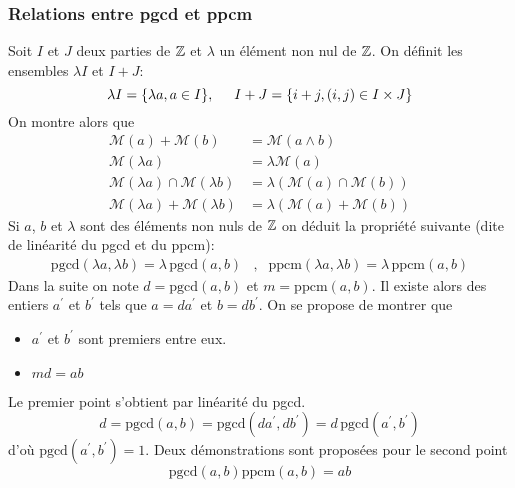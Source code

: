 \begin{propn}
\subsubsection{Relations entre pgcd et ppcm}
Soit $I$ et $J$ deux parties de $\mathbb{Z}$ et $\lambda$ un élément non nul de $\mathbb{Z}$. On définit les ensembles $\lambda I$ et $I+J$:
\begin{displaymath}
  \lambda I = \{\lambda a , a\in I\} ,\hspace{0.5cm} I+J = \left\lbrace i+j, (i,j)\in I\times J\right\rbrace 
\end{displaymath}
On montre alors que 
\begin{align*}
\mathcal{M}(a) + \mathcal{M}(b) &= \mathcal{M}(a\wedge b) \\
 \mathcal M (\lambda a) &= \lambda \mathcal M ( a) \\
\mathcal M (\lambda a)\cap  \mathcal M (\lambda b) &= \lambda \left( \mathcal M ( a) \cap  \mathcal M (b)\right) \\
\mathcal M (\lambda a) + \mathcal M (\lambda b) &= \lambda \left( \mathcal M ( a) +  \mathcal M (b)\right)
\end{align*}
Si $a$, $b$ et $\lambda$ sont des éléments non nuls de $\mathbb{Z}$ on déduit la propriété suivante (dite de linéarité du pgcd et du ppcm):
\begin{align*}
 \text{pgcd}(\lambda a, \lambda b)=\lambda\, \text{pgcd}(a, b) &,& \text{ppcm}(\lambda a, \lambda b)=\lambda\, \text{ppcm}(a, b)
\end{align*}
Dans la suite on note $d=\text{pgcd}(a,b)$ et $m=\text{ppcm}(a, b)$. Il existe alors des entiers $a^\prime$ et $b^\prime$ tels que $a=da^\prime$ et $b=db^\prime$. On se propose de montrer que 
\begin{itemize}
 \item $a^\prime$ et $b^\prime$ sont premiers entre eux.
 \item $md=ab$
\end{itemize}
Le premier point s'obtient par linéarité du pgcd.
\begin{displaymath}
 d=\text{pgcd}(a,b)=\text{pgcd}(da^\prime,db^\prime)=d\,\text{pgcd}(a^\prime,b^\prime)
\end{displaymath}
d'où $\text{pgcd}(a^\prime,b^\prime)=1$.\newline
Deux démonstrations sont proposées pour le second point 
\begin{displaymath}
 \text{pgcd}(a,b)\text{ppcm}(a,b)=ab
\end{displaymath}

\end{propn}
